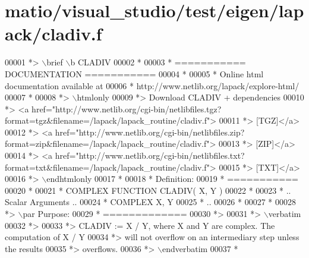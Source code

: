 \hypertarget{matio_2visual__studio_2test_2eigen_2lapack_2cladiv_8f_source}{}\section{matio/visual\+\_\+studio/test/eigen/lapack/cladiv.f}
\label{matio_2visual__studio_2test_2eigen_2lapack_2cladiv_8f_source}

\begin{DoxyCode}
00001 \textcolor{comment}{*> \(\backslash\)brief \(\backslash\)b CLADIV}
00002 \textcolor{comment}{*}
00003 \textcolor{comment}{*  =========== DOCUMENTATION ===========}
00004 \textcolor{comment}{*}
00005 \textcolor{comment}{* Online html documentation available at }
00006 \textcolor{comment}{*            http://www.netlib.org/lapack/explore-html/ }
00007 \textcolor{comment}{*}
00008 \textcolor{comment}{*> \(\backslash\)htmlonly}
00009 \textcolor{comment}{*> Download CLADIV + dependencies }
00010 \textcolor{comment}{*> <a
       href="http://www.netlib.org/cgi-bin/netlibfiles.tgz?format=tgz&filename=/lapack/lapack\_routine/cladiv.f"> }
00011 \textcolor{comment}{*> [TGZ]</a> }
00012 \textcolor{comment}{*> <a
       href="http://www.netlib.org/cgi-bin/netlibfiles.zip?format=zip&filename=/lapack/lapack\_routine/cladiv.f"> }
00013 \textcolor{comment}{*> [ZIP]</a> }
00014 \textcolor{comment}{*> <a
       href="http://www.netlib.org/cgi-bin/netlibfiles.txt?format=txt&filename=/lapack/lapack\_routine/cladiv.f"> }
00015 \textcolor{comment}{*> [TXT]</a>}
00016 \textcolor{comment}{*> \(\backslash\)endhtmlonly }
00017 \textcolor{comment}{*}
00018 \textcolor{comment}{*  Definition:}
00019 \textcolor{comment}{*  ===========}
00020 \textcolor{comment}{*}
00021 \textcolor{comment}{*       COMPLEX FUNCTION CLADIV( X, Y )}
00022 \textcolor{comment}{* }
00023 \textcolor{comment}{*       .. Scalar Arguments ..}
00024 \textcolor{comment}{*       COMPLEX            X, Y}
00025 \textcolor{comment}{*       ..}
00026 \textcolor{comment}{*  }
00027 \textcolor{comment}{*}
00028 \textcolor{comment}{*> \(\backslash\)par Purpose:}
00029 \textcolor{comment}{*  =============}
00030 \textcolor{comment}{*>}
00031 \textcolor{comment}{*> \(\backslash\)verbatim}
00032 \textcolor{comment}{*>}
00033 \textcolor{comment}{*> CLADIV := X / Y, where X and Y are complex.  The computation of X / Y}
00034 \textcolor{comment}{*> will not overflow on an intermediary step unless the results}
00035 \textcolor{comment}{*> overflows.}
00036 \textcolor{comment}{*> \(\backslash\)endverbatim}
00037 \textcolor{comment}{*}

\end{DoxyCode}
